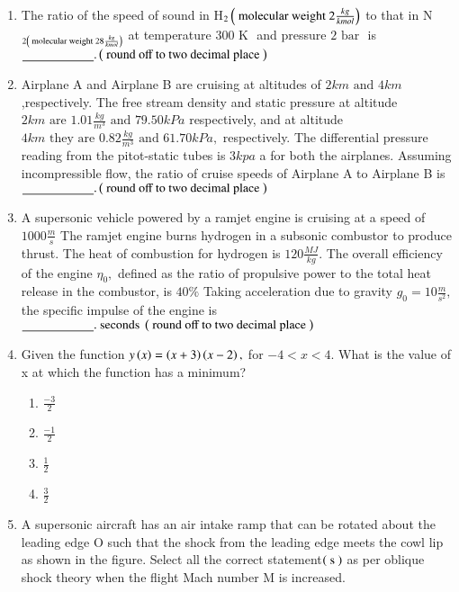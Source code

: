 \documentclass[journal]{IEEEtran}
\begin{document}
\begin{enumerate} [start=27]
\begin{figure}[!ht]
\end{figure}
\bigskip
\item The ratio of the speed of sound in H$_{2}\left(\text{ molecular weight }2\frac{kg}{kmol}\right)$ to that in N$_{2\left(\text{ molecular weight }28\frac{kg}{kmol}\right)}$ at temperature $300\text{ K }$ and pressure $2\text{ bar }$ is $\underline{\hspace{2cm}}.\left(\text{ round off to two decimal place }\right)$
\bigskip
\item Airplane A and Airplane B are cruising at altitudes of $2 km \text{ and } 4 km$,respectively. The free stream density and static pressure at altitude $2 km\text{ are } 1.01\frac{kg}{m^{3}}\text{ and } 79.50 kPa$ respectively, and at altitude $4 km \text{ they are }0.82\frac{kg}{m^{3}}\text{ and }61.70kPa,$ respectively. The differential pressure reading from the pitot-static tubes is
$3kpa$ a for both the airplanes. Assuming incompressible flow, the ratio of
cruise speeds of Airplane A to Airplane B is $\underline{\hspace{2cm}}.\left(\text{ round off to two decimal place }\right)$
\bigskip
\item A supersonic vehicle powered by a ramjet engine is cruising at a speed of $1000\frac{m}{s}$ The ramjet engine burns hydrogen in a subsonic combustor to produce thrust. The heat of combustion for hydrogen is $120\frac{MJ}{kg}.$ The overall efficiency of the engine $\eta_0,$ defined as the ratio of propulsive power to the total heat release in the combustor, is $40\%$ Taking acceleration due to gravity $g_{0}=10\frac{m}{s^{2}},$ the specific impulse of the engine is
$\underline{\hspace{2cm}}.\text{ seconds }\left(\text{ round off to two decimal place }\right)$
\bigskip
\item Given the function $y\left(x\right)=\left(x+3\right)\left(x-2\right),$ for $-4<x<4.$ What is the value of x at which the function has a minimum?
\begin{multicols}{4}
\begin{enumerate}
    \item $\frac{-3}{2}$
    \item $\frac{-1}{2}$
    \item $\frac{1}{2}$
    \item $\frac{3}{2}$
\end{enumerate}
\end{multicols}
\bigskip
\item A supersonic aircraft has an air intake ramp that can be rotated about the leading edge O such that the shock from the leading edge meets the cowl lip as shown in the figure. Select all the correct statement$\left(\text{ s }\right)$ as per oblique shock theory when the flight Mach number M is increased.

\end{enumerate}
\end{document}
